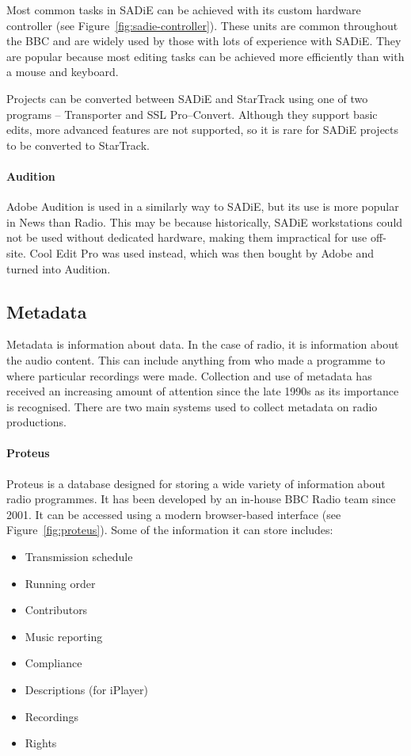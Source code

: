 Most common tasks in SADiE can be achieved with its custom hardware controller
(see Figure~\ref{fig:sadie-controller}). These units are common throughout the
BBC and are widely used by those with lots of experience with SADiE. They are
popular because most editing tasks can be achieved more efficiently than with a
mouse and keyboard.

Projects can be converted between SADiE and StarTrack using one of two programs
-- Transporter and SSL Pro--Convert. Although they support basic edits, more
advanced features are not supported, so it is rare for SADiE projects to be
converted to StarTrack.

\paragraph{Audition}
Adobe Audition is used in a similarly way to SADiE, but its use is more popular
in News than Radio. This may be because historically, SADiE workstations could
not be used without dedicated hardware, making them impractical for use
off-site. Cool Edit Pro was used instead, which was then bought by Adobe and
turned into Audition.

\subsection{Metadata}
Metadata is information about data. In the case of radio, it is information
about the audio content. This can include anything from who made a programme to
where particular recordings were made. Collection and use of metadata has
received an increasing amount of attention since the late 1990s as its
importance is recognised. There are two main systems used to collect metadata
on radio productions.

\paragraph{Proteus}
Proteus is a database designed for storing a wide variety of information about
radio programmes. It has been developed by an in-house BBC Radio team since
2001. It can be accessed using a modern browser-based interface (see
Figure~\ref{fig:proteus}). Some of the information it can store includes:
\begin{itemize}
  \item Transmission schedule
  \item Running order
  \item Contributors
  \item Music reporting
  \item Compliance
  \item Descriptions (for iPlayer)
  \item Recordings
  \item Rights
\end{itemize}

